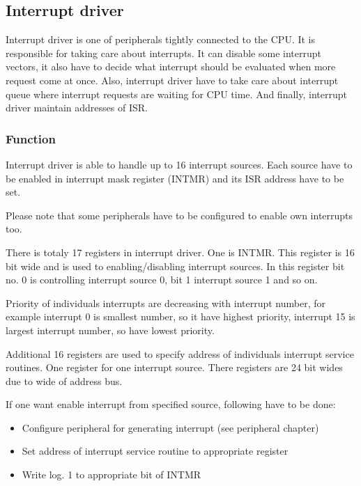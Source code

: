 \subsection{Interrupt driver}

Interrupt driver is one of peripherals tightly connected to the CPU. It is
responsible for taking care about interrupts. It can disable some interrupt
vectors, it also have to decide what interrupt should be evaluated when more
request come at once. Also, interrupt driver have to take care about interrupt
queue where interrupt requests are waiting for CPU time. And finally, interrupt
driver maintain addresses of ISR.

\subsubsection{Function}

Interrupt driver is able to handle up to 16 interrupt sources. Each source have
to be enabled in interrupt mask register (INTMR) and its ISR address have to be
set.

Please note that some peripherals have to be configured to enable own
interrupts too.

There is totaly 17 registers in interrupt driver. One is INTMR. This register
is 16 bit wide and is used to enabling/disabling interrupt sources. In this
register bit no. 0 is controlling interrupt source 0, bit 1 interrupt source 1
and so on.

Priority of individuals interrupts are decreasing with interrupt number, for
example interrupt 0 is smallest number, so it have highest priority, interrupt
15 is largest interrupt number, so have lowest priority.

Additional 16 registers are used to specify address of individuals interrupt
service routines. One register for one interrupt source. There registers are
24 bit wides due to wide of address bus.

If one want enable interrupt from specified source, following have to be done:

\begin{itemize}
    \item Configure peripheral for generating interrupt (see peripheral chapter)
    \item Set address of interrupt service routine to appropriate register
    \item Write log. 1 to appropriate bit of INTMR
\end{itemize}


